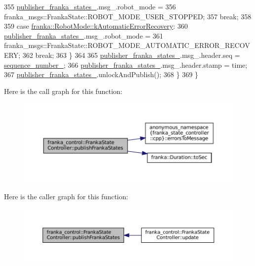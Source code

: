 \begin{DoxyCode}
355         \hyperlink{classfranka__control_1_1FrankaStateController_a2ec0c84ee9474f84577a740360aae2e3}{publisher\_franka\_states\_}.msg\_.robot\_mode =
356             franka\_msgs::FrankaState::ROBOT\_MODE\_USER\_STOPPED;
357         \textcolor{keywordflow}{break};
358 
359       \textcolor{keywordflow}{case} \hyperlink{namespacefranka_adfe059ae23ebbad59e421edaa879651aab37e3f1dba8351f3745083064998b35f}{franka::RobotMode::kAutomaticErrorRecovery}:
360         \hyperlink{classfranka__control_1_1FrankaStateController_a2ec0c84ee9474f84577a740360aae2e3}{publisher\_franka\_states\_}.msg\_.robot\_mode =
361             franka\_msgs::FrankaState::ROBOT\_MODE\_AUTOMATIC\_ERROR\_RECOVERY;
362         \textcolor{keywordflow}{break};
363     \}
364 
365     \hyperlink{classfranka__control_1_1FrankaStateController_a2ec0c84ee9474f84577a740360aae2e3}{publisher\_franka\_states\_}.msg\_.header.seq = 
      \hyperlink{classfranka__control_1_1FrankaStateController_ae36c62620e0099ce91976548bf51f240}{sequence\_number\_};
366     \hyperlink{classfranka__control_1_1FrankaStateController_a2ec0c84ee9474f84577a740360aae2e3}{publisher\_franka\_states\_}.msg\_.header.stamp = time;
367     \hyperlink{classfranka__control_1_1FrankaStateController_a2ec0c84ee9474f84577a740360aae2e3}{publisher\_franka\_states\_}.unlockAndPublish();
368   \}
369 \}
\end{DoxyCode}
Here is the call graph for this function\+:
\nopagebreak
\begin{figure}[H]
\begin{center}
\leavevmode
\includegraphics[width=350pt]{classfranka__control_1_1FrankaStateController_a70977857f43faff9127db1ebfeddc1b5_cgraph}
\end{center}
\end{figure}
Here is the caller graph for this function\+:
\nopagebreak
\begin{figure}[H]
\begin{center}
\leavevmode
\includegraphics[width=350pt]{classfranka__control_1_1FrankaStateController_a70977857f43faff9127db1ebfeddc1b5_icgraph}
\end{center}
\end{figure}
